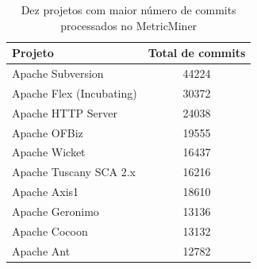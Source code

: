 \documentclass[a4paper, 12pt, twoside]{book}
\begin{document}
        \begin{table}\begin{center}
        \begin{tabular}{| p{6cm} | c |}
            \hline                        
            \textbf{Projeto} & \textbf{Total de commits} \\
            \hline                        
            Apache Subversion & 44224 \\
            \hline
            Apache Flex (Incubating) & 30372 \\
            \hline
            Apache HTTP Server & 24038 \\
            \hline
            Apache OFBiz & 19555 \\
            \hline
            Apache Wicket & 16437 \\
            \hline
            Apache Tuscany SCA 2.x & 16216 \\
            \hline
            Apache Axis1 & 18610 \\
            \hline
            Apache Geronimo & 13136 \\
            \hline
            Apache Cocoon & 13132 \\
            \hline
            Apache Ant & 12782 \\
            \hline
        \end{tabular}
        \caption{Dez projetos com maior número de commits processados no MetricMiner \label{tab:commits}}
        \end{center}\end{table}
\end{document}
